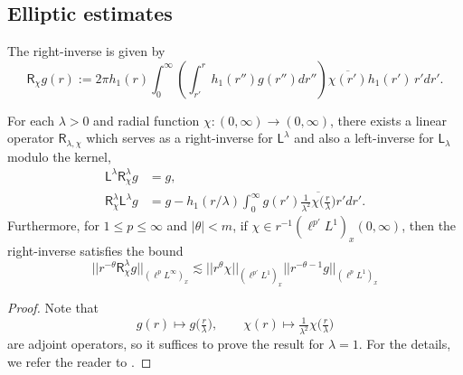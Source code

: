 \subsection{Elliptic estimates}

The right-inverse is given by 
    \[
        \mathsf R_\chi g (r) 
            := 2\pi h_1 (r) \int_0^\infty \left( \int_{r'}^r h_1(r'') g(r'') dr'' \right) \overline{\chi (r')} h_1 (r') \, r' dr'.  
    \]

\begin{lemma}\label{lem:linearelliptic}
    For each $\lambda > 0$ and radial function $\chi : (0, \infty) \to (0, \infty)$, there exists a linear operator $\mathsf R_{\lambda, \chi}$ which serves as a right-inverse for $\mathsf L^\lambda$ and also a left-inverse for $\mathsf L_{\lambda}$ modulo the kernel, 
        \begin{align}
            \mathsf L^\lambda \mathsf R^\lambda_{\chi} g 
                &= g, \\
            \mathsf R^\lambda_{\chi} \mathsf L^\lambda g
                &= g - h_1 (r/\lambda) \int_0^\infty g (r')\overline{\tfrac{1}{\lambda^2} \chi \big( \tfrac{r}{\lambda}\big)} r' dr'.
        \end{align}
Furthermore, for $1 \leq p \leq \infty$ and $|\theta| < m$, if $\chi \in r^{-1} (\ell^{p'} L^1)_x (0, \infty)$, then the right-inverse satisfies the bound
        \begin{equation}
            || r^{-\theta} \mathsf R^\lambda_{\chi} g ||_{(\ell^p L^\infty)_x} 
                \lesssim || r^\theta \chi||_{ (\ell^{p'}L^1)_x} || r^{-\theta - 1}g||_{ (\ell^p L^1)_x}
        \end{equation}
\end{lemma}

\begin{proof}
    Note that 
        \[
            g(r) 
                \mapsto g\big(\tfrac{r}\lambda\big), \qquad
            \chi(r) 
                \mapsto \tfrac{1}{\lambda^2} \chi \big( \tfrac{r}{\lambda}\big)
        \]
    are adjoint operators, so it suffices to prove the result for $\lambda = 1$. For the details, we refer the reader to \cite[Section 10.1]{GustafsonEtAl2010}. 
\end{proof}

